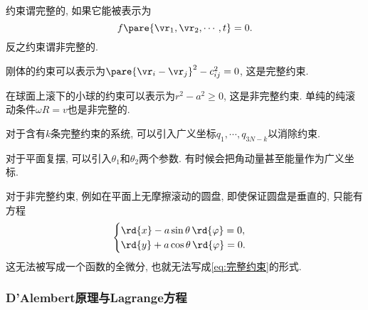 \documentclass[../TheoreticalMechanics.tex]{subfiles}
\begin{document}
\begin{definition}[完整约束]
	约束谓完整的, 如果它能被表示为
	\begin{equation}
		\label{eq:完整约束}
		f\pare{\vr_1, \vr_2, \cdots, t} = 0.
	\end{equation}
	反之约束谓非完整的.
\end{definition}
\begin{ex}
	刚体的约束可以表示为$\pare{\vr_i - \vr_j}^2 - c_{ij}^2 = 0$, 这是完整约束.
\end{ex}
\begin{ex}
	在球面上滚下的小球的约束可以表示为$r^2 - a^2 \ge 0$, 这是非完整约束. 单纯的纯滚动条件$\omega R = v$也是非完整的.
\end{ex}
\begin{definition}[广义坐标]
	对于含有$k$条完整约束的系统, 可以引入广义坐标$q_1,\cdots,q_{3N-k}$以消除约束.
\end{definition}
\begin{ex}
	对于平面复摆, 可以引入$\theta_1$和$\theta_2$两个参数. 有时候会把角动量甚至能量作为广义坐标.
\end{ex}
\begin{ex}
	对于非完整约束, 例如在平面上无摩擦滚动的圆盘, 即使保证圆盘是垂直的, 只能有方程
	\[ \begin{cases}
		\rd{x} - a\sin\theta\,\rd{\varphi} = 0,\\
		\rd{y} + a\cos\theta\,\rd{\varphi} = 0.
	\end{cases} \]
	这无法被写成一个函数的全微分, 也就无法写成\eqref{eq:完整约束}的形式.
\end{ex}


\subsubsection{D'Alembert原理与Lagrange方程} %
\label{ssub:d_alembert原理与lagrange方程}
\end{document}
